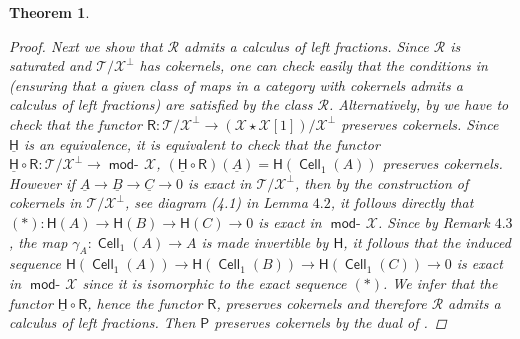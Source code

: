 \documentclass[oneside, a4paper,reqno]{amsart}
\numberwithin{equation}{section}
\newtheorem{thm}{Theorem}[section]
\theoremstyle{definition}
\begin{document}
\begin{thm}
\begin{proof}
Next we show that $\mathcal R$ admits a calculus of left fractions. Since $\mathcal R$ is saturated and ${\mathcal T}/{\mathcal X}^{\bot}$ has cokernels, one can check easily that the conditions in \cite[19.3.5(b)]{Schubert} (ensuring that a given class of maps in a category with cokernels admits a calculus of left fractions) are satisfied by the class $\mathcal R$. Alternatively, by \cite[Proposition I.3.4]{GZ} we have to check that the functor $\mathsf{R} \colon {\mathcal T}/{\mathcal X}^{\bot} {\longrightarrow}  ({\mathcal X}\star {\mathcal X}[1])/{\mathcal X}^{\bot}$ preserves cokernels. Since $\underline{\mathsf{H}}$ is an equivalence, it is equivalent to check that the functor $\underline{\mathsf{H}} \circ \mathsf{R} \colon {\mathcal T}/{\mathcal X}^{\bot} {\longrightarrow} \operatorname*{\mathsf{mod}-\!}{\mathcal X}$, $(\underline{\mathsf{H}} \circ \mathsf{R})({\underline A}) = \mathsf{H}(\operatorname*{{\mathsf{Cell}}}_{1}(A))$ preserves cokernels. However  if ${\underline A} {\longrightarrow} {\underline B} {\longrightarrow} {\underline C} {\longrightarrow} 0$ is exact in ${\mathcal T}/{\mathcal X}^{\bot}$, then by the construction of cokernels in ${\mathcal T}/{\mathcal X}^{\bot}$, see diagram (4.1) in Lemma $4.2$, it follows directly that $(*): \mathsf{H}(A) {\longrightarrow} \mathsf{H}(B) {\longrightarrow} \mathsf{H}(C) {\longrightarrow} 0$ is exact in $\operatorname*{\mathsf{mod}-\!}{\mathcal X}$. Since by Remark $4.3$, the map $\gamma_{A} \colon \operatorname*{{\mathsf{Cell}}}_{1}(A) {\longrightarrow} A$ is made invertible by $\mathsf{H}$, it follows that  the induced sequence $\mathsf{H}(\operatorname*{{\mathsf{Cell}}}_{1}(A)) {\longrightarrow} \mathsf{H}(\operatorname*{{\mathsf{Cell}}}_{1}(B)) {\longrightarrow} \mathsf{H}(\operatorname*{{\mathsf{Cell}}}_{1}(C)) {\longrightarrow} 0$ is exact in $\operatorname*{\mathsf{mod}-\!}{\mathcal X}$ since it is isomorphic to the exact sequence $(*)$. We infer that the functor $\underline{\mathsf{H}} \circ \mathsf{R}$, hence the functor $\mathsf{R}$, preserves cokernels and therefore  $\mathcal R$ admits a calculus of left fractions. Then  $\mathsf{P}$ preserves cokernels by the dual of \cite[I.3.1]{GZ}. 


\end{proof}
\end{thm}
\end{document}
